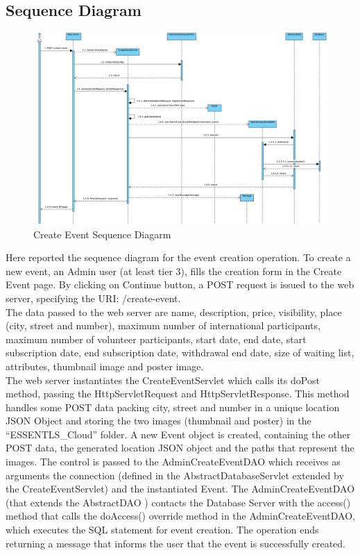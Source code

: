 \subsection{Sequence Diagram}

\begin{figure}[H]
    \centering
    \includegraphics[width=1\textwidth]{images/CreateEventSequence.png}
    \caption{Create Event Sequence Diagarm}
    \label{fig:create event sequence diagram}
\end{figure}

Here reported the sequence diagram for the event creation operation.
To create a new event, an Admin user (at least tier 3), fills the creation form in the Create Event page.
By clicking on Continue button, a POST request is issued to the web server, specifying the URI: /create-event. \\
The data passed to the web server are name, description, price, visibility, place (city, street and number),
maximum number of international participants, maximum number of volunteer participants, start date, end date,
start subscription date, end subscription date, withdrawal end date, size of waiting list, attributes,
thumbnail image and poster image. \\
The web server instantiates the CreateEventServlet which calls its doPost method, passing the HttpServletRequest
and HttpServletResponse. This method handles some POST data packing city, street and number in a unique location JSON
Object and storing the two images (thumbnail and poster) in the “ESSENTLS\_Cloud” folder.
A new Event object is created, containing the other POST data, the generated location JSON object and the paths that
represent the images. The control is passed to the AdminCreateEventDAO which receives as arguments the connection
(defined in the AbstractDatabaseServlet extended by the CreateEventServlet) and the instantiated Event.
The AdminCreateEventDAO (that extends the AbstractDAO ) contacts the Database Server with the access() method that
calls the doAccess() override method in the AdminCreateEventDAO, which executes the SQL statement for event creation.
The operation ends returning a message that informs the user that the event is successfully created.